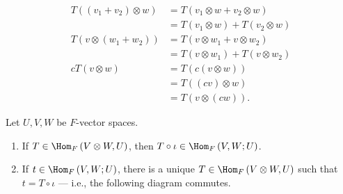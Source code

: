 \documentclass[10pt]{mypackage}
\begin{document}
  \begin{align*}
    T\left(\left(v_1 + v_2\right)\otimes w\right) &= T\left(v_1\otimes w + v_2\otimes w\right)\\
                                                  &= T\left(v_1\otimes w\right) + T\left(v_2\otimes w\right)\\
    T\left(v\otimes \left(w_1 + w_2\right) \right) &= T\left(v\otimes w_1 + v\otimes w_2\right)\\
                                                   &= T\left(v\otimes w_1\right) + T\left(v\otimes w_2\right)\\
    cT\left(v\otimes w\right) &= T\left(c\left(v\otimes w\right)\right)\\
                              &= T\left(\left(cv\right)\otimes w\right)\\
                              &= T\left(v\otimes \left(cw\right)\right).
  \end{align*}
  \begin{theorem}
    Let $U,V,W$ be $F$-vector spaces. 
    \begin{enumerate}[(1)]
      \item If $T\in \Hom_{F}\left(V\otimes W,U\right)$, then $T\circ\iota \in \Hom_{F}\left(V,W;U\right)$.
      \item If $t\in \Hom_{F}\left(V,W;U\right)$, there is a unique $T\in \Hom_{F}\left(V\otimes W,U\right)$ such that $t = T\circ \iota$ --- i.e., the following diagram commutes.
        \begin{center}
        \end{center}
    \end{enumerate}
  \end{theorem}
\end{document}
